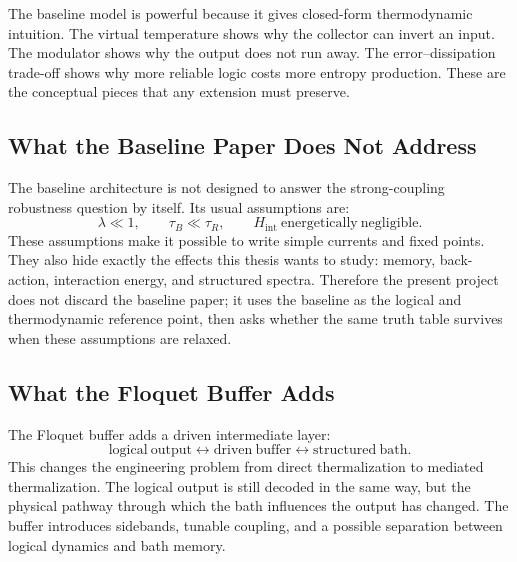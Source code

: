 \documentclass[11pt]{article}
\begin{document}
The baseline model is powerful because it gives closed-form thermodynamic intuition.  The
virtual temperature shows why the collector can invert an input.  The modulator shows why
the output does not run away.  The error--dissipation trade-off shows why more reliable
logic costs more entropy production.  These are the conceptual pieces that any extension
must preserve.

\subsection{What the Baseline Paper Does Not Address}

The baseline architecture is not designed to answer the strong-coupling robustness question
by itself.  Its usual assumptions are:
\begin{equation}
    \lambda\ll 1,\qquad
    \tau_B\ll\tau_R,\qquad
    H_{\mathrm{int}}\ \mathrm{energetically\ negligible}.
\end{equation}
These assumptions make it possible to write simple currents and fixed points.  They also
hide exactly the effects this thesis wants to study: memory, back-action, interaction energy,
and structured spectra.  Therefore the present project does not discard the baseline paper;
it uses the baseline as the logical and thermodynamic reference point, then asks whether the
same truth table survives when these assumptions are relaxed.

\subsection{What the Floquet Buffer Adds}

The Floquet buffer adds a driven intermediate layer:
\begin{equation}
    \mathrm{logical\ output}
    \longleftrightarrow
    \mathrm{driven\ buffer}
    \longleftrightarrow
    \mathrm{structured\ bath}.
\end{equation}
This changes the engineering problem from direct thermalization to mediated thermalization.
The logical output is still decoded in the same way, but the physical pathway through which
the bath influences the output has changed.  The buffer introduces sidebands, tunable
coupling, and a possible separation between logical dynamics and bath memory.
\end{document}
